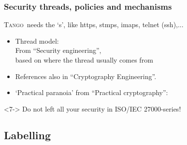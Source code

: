 \documentclass{beamer}
\newcommand{\tango}{\textsc{Tango}}
\begin{document}
\begin{frame}
\frametitle{Security threads, policies and mechanisms}
    \begin{block}{}
        \tango\, needs the `\alert{s}', like http\alert{s}, stmp\alert{s}, imap\alert{s}, telnet (\alert{ssh}),...
    \end{block}
    \begin{itemize}
        \item<2-> Thread model:\\From ``Security engineering''\cite{SecEngRossAnderson},\\based on where the thread usually comes from
        \item<4-> References also in ``Cryptography Engineering''\cite{cryptoEngineering}.
        \item<5-> `Practical paranoia' from ``Practical cryptography''\cite{PractCryptoSchneier}:
    \end{itemize}
    \begin{alertblock}{}<7->
        Do not left all your security in ISO/IEC 27000-series!
    \end{alertblock}
\end{frame}

\subsection{Labelling}
\end{document}
